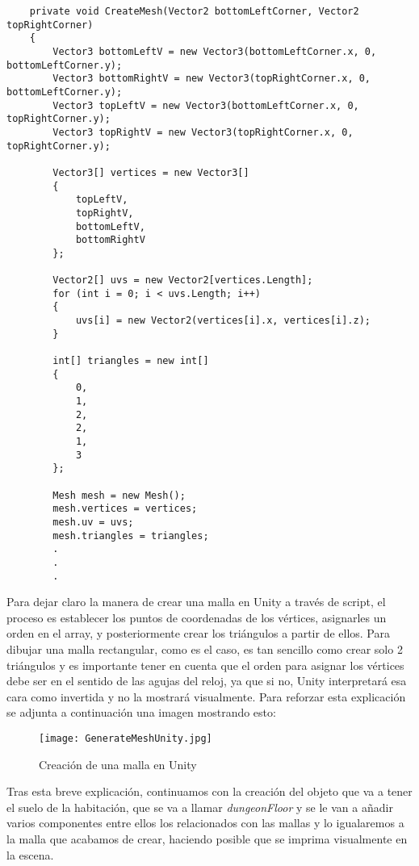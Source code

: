 \begin{lstlisting}
    private void CreateMesh(Vector2 bottomLeftCorner, Vector2 topRightCorner)
    {
        Vector3 bottomLeftV = new Vector3(bottomLeftCorner.x, 0, bottomLeftCorner.y);
        Vector3 bottomRightV = new Vector3(topRightCorner.x, 0, bottomLeftCorner.y);
        Vector3 topLeftV = new Vector3(bottomLeftCorner.x, 0, topRightCorner.y);
        Vector3 topRightV = new Vector3(topRightCorner.x, 0, topRightCorner.y);

        Vector3[] vertices = new Vector3[]
        {
            topLeftV,
            topRightV,
            bottomLeftV,
            bottomRightV
        };

        Vector2[] uvs = new Vector2[vertices.Length];
        for (int i = 0; i < uvs.Length; i++)
        { 
            uvs[i] = new Vector2(vertices[i].x, vertices[i].z);
        }

        int[] triangles = new int[]
        {
            0,
            1,
            2,
            2,
            1,
            3
        };

        Mesh mesh = new Mesh();
        mesh.vertices = vertices;
        mesh.uv = uvs;
        mesh.triangles = triangles;
        .
        .
        .
\end{lstlisting}

Para dejar claro la manera de crear una malla en Unity a través de script, el proceso es establecer los puntos de coordenadas de los vértices, asignarles un orden en el array, y posteriormente crear los triángulos a partir de ellos. Para dibujar una malla rectangular, como es el caso, es tan sencillo como crear solo 2 triángulos y es importante tener en cuenta que el orden para asignar los vértices debe ser en el sentido de las agujas del reloj, ya que si no, Unity interpretará esa cara como invertida y no la mostrará visualmente. Para reforzar esta explicación se adjunta a continuación una imagen mostrando esto: 

\begin{figure}[H]
    \centering
    \texttt{[image: GenerateMeshUnity.jpg]}
    \caption{Creación de una malla en Unity}
\end{figure}

Tras esta breve explicación, continuamos con la creación del objeto que va a tener el suelo de la habitación, que se va a llamar \textit{dungeonFloor} y se le van a añadir varios componentes entre ellos los relacionados con las mallas y lo igualaremos a la malla que acabamos de crear, haciendo posible que se imprima visualmente en la escena. 

